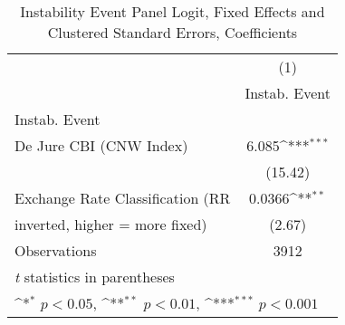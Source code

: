 \begin{table}[htbp]\centering
\def\sym#1{\ifmmode^{#1}\else\(^{#1}\)\fi}
\caption{Instability Event Panel Logit, Fixed Effects and Clustered Standard Errors, Coefficients \label{coeffsJustBinInstabEventDJ}}
\begin{tabular}{l*{1}{c}}
\toprule
                                        &\multicolumn{1}{c}{(1)}\\
                                        &\multicolumn{1}{c}{Instab. Event}\\
\midrule
Instab. Event                           &                  \\
De Jure CBI (CNW Index)                 &    6.085\sym{***}\\
                                        &  (15.42)         \\
\addlinespace
Exchange Rate Classification (RR        &   0.0366\sym{**} \\
inverted, higher = more fixed)          &   (2.67)         \\
\midrule
Observations                            &     3912         \\
\bottomrule
\multicolumn{2}{l}{\footnotesize \textit{t} statistics in parentheses}\\
\multicolumn{2}{l}{\footnotesize \sym{*} \(p<0.05\), \sym{**} \(p<0.01\), \sym{***} \(p<0.001\)}\\
\end{tabular}
\end{table}
